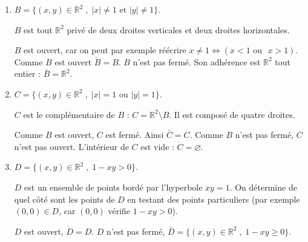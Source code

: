 \documentclass[11pt,a4paper]{article}
\newcommand{\Rr}{\mathbb{R}} \newcommand{\R}{\mathbb{R}}
\renewcommand{\ge}{\geqslant} \renewcommand{\geq}{\geqslant}
\theoremstyle{exostyle}
\begin{document}
\begin{enumerate}
\begin{center}
	\end{center}
	
	\item $B = \{ (x,y) \in \R^2 \; , \;|x| \not = 1 \mbox{ et } |y| \not = 1 \} $.
	
	$B$ est tout $\Rr^2$ privé de deux droites verticales et deux droites horizontales.
	
	$B$ est ouvert, car on peut par exemple réécrire $x\neq1 \iff (x<1 \text{ ou  } x>1)$.
	Comme $B$ est ouvert $\mathring B=B$.
	$B$ n'est pas fermé. Son adhérence est $\Rr^2$ tout entier : $\bar B=\Rr^2$.
	
	\item $C = \{ (x,y) \in \R^2 \; , \; |x|  = 1 \mbox{ ou } |y| = 1 \} $.
	
	$C$ est le complémentaire de $B$ : $C = \Rr^2 \setminus B$. Il est composé de quatre droites.
	
	Comme $B$ est ouvert, $C$ est fermé. Ainsi $\bar C = C$.
	Comme $B$ n'est pas fermé, $C$ n'est pas ouvert.
	L'intérieur de $C$ est vide : $\mathring C = \varnothing$.
		
	\item $D = \{ (x,y) \in \R^2 \; , \; 1 - xy >  0 \} $.
	
	$D$ est un ensemble de points bordé par l'hyperbole $xy=1$. 
	On détermine de quel côté sont les points de $D$ en testant des points particuliers (par exemple $(0,0) \in D$, car $(0,0)$ vérifie $1-xy>0$).
	
	$D$ est ouvert, $\mathring D=D$.
	$D$ n'est pas fermé, $\bar D =  \{ (x,y) \in \R^2 \; , \; 1 - xy \ge  0 \} $.
	
	\begin{center}
		\begin{tikzpicture}[scale=0.5]
			

\end{tikzpicture}
\end{center}
\end{enumerate}
\end{document}
